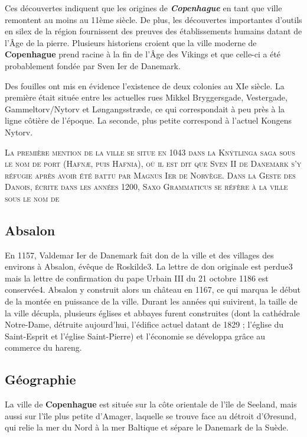 \documentclass[a4paper,10pt,openany]{memoir}
\begin{document}
{\large Ces découvertes indiquent que les origines de \emph{\textbf{Copenhague}} en tant que ville remontent au moins au 
11ème siècle. De plus, les découvertes importantes d'outils en silex de la région fournissent des 
preuves des établissements humains datant de l'Âge de la pierre. Plusieurs historiens croient que 
la ville moderne de \textbf{Copenhague} prend racine à la fin de l'Âge des Vikings et que celle-ci a été probablement
fondée par Sven Ier de Danemark.}

{\huge Des fouilles ont mis en évidence l'existence de deux colonies au XIe siècle. La première était située
entre les actuelles rues Mikkel Bryggersgade, Vestergade, Gammeltorv/Nytorv et Løngangsstræde, ce qui 
correspondait à peu près à la ligne côtière de l'époque. La seconde, plus petite correspond à l'actuel 
Kongens Nytorv.

\textsc{
La première mention de la ville se situe en 1043 dans la Knýtlinga saga sous le nom de port (Hafnæ, puis 
Hafnia), où il est dit que Sven II de Danemark s'y réfugie après avoir été battu par Magnus Ier de Norvège.
Dans la Geste des Danois, écrite dans les années 1200, Saxo Grammaticus se réfère à la ville sous le nom de }}
\nopagebreak
\subsection*{Absalon}
\textmd{
En 1157, Valdemar Ier de Danemark fait don de la ville et des villages des environs à Absalon, évêque de
Roskilde3. La lettre de don originale est perdue3 mais la lettre de confirmation du pape Urbain III du 21 
octobre 1186 est conservée4. Absalon y construit alors un château en 1167, ce qui marqua le début de la 
montée en puissance de la ville. Durant les années qui suivirent, la taille de la ville décupla, plusieurs
églises et abbayes furent construites (dont la cathédrale Notre-Dame, détruite aujourd'hui, l'édifice actuel
datant de 1829 ; l'église du Saint-Esprit et l'église Saint-Pierre) et l'économie se développa grâce au 
commerce du hareng.}

\subsection*{Géographie}
\textrm{
La ville de \textbf{Copenhague} est située sur la côte orientale de l'île de Seeland, mais aussi sur l'île plus 
petite d'Amager, laquelle se trouve face au détroit d'Øresund, qui relie la mer du Nord à la mer Baltique
et sépare le Danemark de la Suède.}
\end{document}
